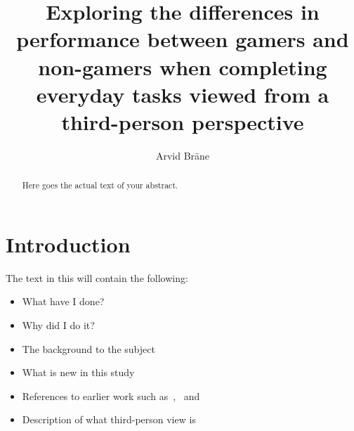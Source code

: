 \documentclass[runningheads,a4paper,oribibl]{llncs}
\begin{document}
\pagestyle{headings}

\mainmatter

\title{Exploring the differences in performance between gamers and non-gamers when completing everyday tasks viewed from a third-person perspective}



\author{Arvid Bräne}


\maketitle


\begin{abstract}
	Here goes the actual text of your abstract.
\end{abstract}














\section{Introduction}
The text in this will contain the following:
\begin{itemize}
	\item What have I done?
	\item Why did I do it?
	\item The background to the subject
	\item What is new in this study
	\item References to earlier work such as~\cite{schmierbach2011exploring},~\cite{salamin2006benefits} and~\cite{nakamura20103pi}
	\item Description of what third-person view is
\end{itemize}
\end{document}
